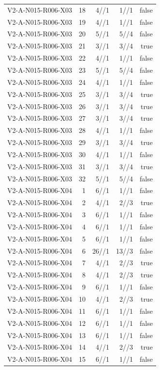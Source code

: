 {\begin{longtable}{lrrrr}
V2-A-N015-R006-X03 & 18 & 4//1 & 1//1 & false \\
V2-A-N015-R006-X03 & 19 & 4//1 & 1//1 & false \\
V2-A-N015-R006-X03 & 20 & 5//1 & 5//4 & false \\
V2-A-N015-R006-X03 & 21 & 3//1 & 3//4 & true \\
V2-A-N015-R006-X03 & 22 & 4//1 & 1//1 & false \\
V2-A-N015-R006-X03 & 23 & 5//1 & 5//4 & false \\
V2-A-N015-R006-X03 & 24 & 4//1 & 1//1 & false \\
V2-A-N015-R006-X03 & 25 & 3//1 & 3//4 & true \\
V2-A-N015-R006-X03 & 26 & 3//1 & 3//4 & true \\
V2-A-N015-R006-X03 & 27 & 3//1 & 3//4 & true \\
V2-A-N015-R006-X03 & 28 & 4//1 & 1//1 & false \\
V2-A-N015-R006-X03 & 29 & 3//1 & 3//4 & true \\
V2-A-N015-R006-X03 & 30 & 4//1 & 1//1 & false \\
V2-A-N015-R006-X03 & 31 & 3//1 & 3//4 & true \\
V2-A-N015-R006-X03 & 32 & 5//1 & 5//4 & false \\
V2-A-N015-R006-X04 & 1 & 6//1 & 1//1 & false \\
V2-A-N015-R006-X04 & 2 & 4//1 & 2//3 & true \\
V2-A-N015-R006-X04 & 3 & 6//1 & 1//1 & false \\
V2-A-N015-R006-X04 & 4 & 6//1 & 1//1 & false \\
V2-A-N015-R006-X04 & 5 & 6//1 & 1//1 & false \\
V2-A-N015-R006-X04 & 6 & 26//1 & 13//3 & false \\
V2-A-N015-R006-X04 & 7 & 4//1 & 2//3 & true \\
V2-A-N015-R006-X04 & 8 & 4//1 & 2//3 & true \\
V2-A-N015-R006-X04 & 9 & 6//1 & 1//1 & false \\
V2-A-N015-R006-X04 & 10 & 4//1 & 2//3 & true \\
V2-A-N015-R006-X04 & 11 & 6//1 & 1//1 & false \\
V2-A-N015-R006-X04 & 12 & 6//1 & 1//1 & false \\
V2-A-N015-R006-X04 & 13 & 6//1 & 1//1 & false \\
V2-A-N015-R006-X04 & 14 & 4//1 & 2//3 & true \\
V2-A-N015-R006-X04 & 15 & 6//1 & 1//1 & false \\

\end{longtable}}
